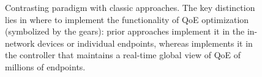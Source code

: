 \begin{figure}[t!]
\captionsetup[subfigure]{justification=centering,farskip=-1pt,captionskip=5pt}
\centering
\caption{Contrasting \ddn paradigm with classic approaches. 
The key distinction lies in where to implement the functionality of QoE optimization 
(symbolized by the gears): prior approaches implement 
it in the in-network devices or individual endpoints, whereas \ddn implements 
it in the controller that maintains a real-time global view of QoE of millions of endpoints.}
\vspace{-0.1cm}
\label{fig:intro:contrast}
\end{figure}

